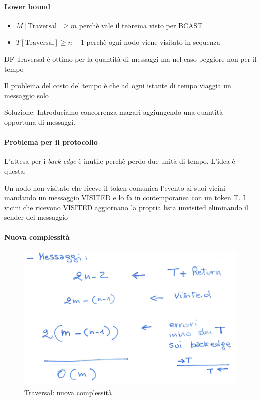 \paragraph{Lower bound}
\begin{itemize}
    \item $M[\text{Traversal}] \geq m$ perchè vale il teorema visto per BCAST
    \item $T[\text{Traversal}] \geq n-1$ perchè ogni nodo viene visitato in sequenza
\end{itemize}

DF-Traversal è ottimo per la quantità di messaggi ma nel caso peggiore non per il tempo

\begin{osservazione}
    Il problema del costo del tempo è che ad ogni istante di tempo viaggia un messaggio solo

    Soluzione: Introduciamo concorrenza magari aggiungendo una quantità opportuna di messaggi.
\end{osservazione}

\paragraph{Problema per il protocollo} L'attesa per i \textit{back-edge} è inutile perchè perdo due unità di tempo. L'idea è questa: 

Un nodo non visitato che riceve il token comunica l'evento ai suoi vicini mandando un messaggio VISITED e lo fa in contemporanea con un token T. I vicini che ricevono VISITED aggiornano la propria lista unvisited eliminando il sender del messaggio

\paragraph{Nuova complessità}
\begin{figure}[h]
    \centering
    \includegraphics[scale=0.4]{images/traversal.png}
    \caption{Traversal: nuova complessità}
\end{figure}

